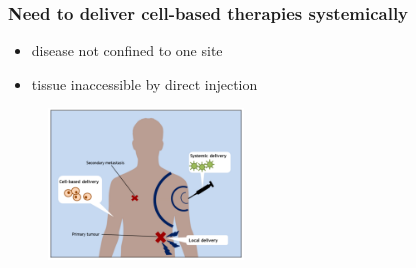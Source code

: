 \documentclass[8pt,xcolor=table]{beamer}
\begin{document}
% 
% 
%  
% 
% 
% 


\begin{frame}
\frametitle{Need to deliver cell-based therapies systemically}
 
\begin{itemize}
 \item disease not confined to one site
 \item tissue inaccessible by direct injection
\end{itemize}
 
 
\begin{figure}
\centering
\includegraphics[height=4cm]{systemic}
\end{figure}

 
\end{frame}
\end{document}
